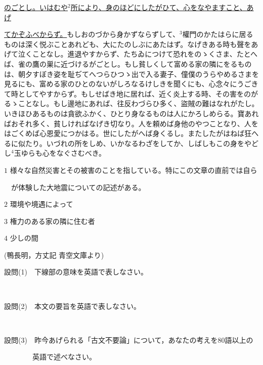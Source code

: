 \documentclass[12pt,a4paper,dvipdfmx]{jarticle}
\begin{document}
\begin{spacing}{1.5}
\hspace{-4mm}
\underline{のごとし。いはむや$^{2}$所により、身のほどにしたがひて、心をなやますこと、あげ}

\hspace{-4mm}
\underline{てかぞふべからず。}もしおのづから身かずならずして、$^{3}$權門のかたはらに居るものは深く悦ぶことあれども、大にたのしぶにあたはず。なげきある時も聲をあげて泣くことなし。進退やすからず、たちゐにつけて恐れをのゝくさま、たとへば、雀の鷹の巣に近づけるがごとし。もし貧しくして富める家の隣にをるものは、朝夕すぼき姿を耻ぢてへつらひつゝ出で入る妻子、僮僕のうらやめるさまを見るにも、富める家のひとのないがしろなるけしきを聞くにも、心念々にうごきて時としてやすからず。もしせばき地に居れば、近く炎上する時、その害をのがるゝことなし。もし邊地にあれば、往反わづらひ多く、盜賊の難はなれがたし。いきほひあるものは貪欲ふかく、ひとり身なるものは人にかろしめらる。寶あればおそれ多く、貧しければなげき切なり。人を頼めば身他のやつことなり、人をはごくめば心恩愛につかはる。世にしたがへば身くるし。またしたがはねば狂へるに似たり。いづれの所をしめ、いかなるわざをしてか、しばしもこの身をやどし$^{4}$玉ゆらも心をなぐさむべき。

\vspace{7mm}

$1$ 様々な自然災害とその被害のことを指している。特にこの文章の直前では自ら

　が体験した大地震についての記述がある。

$2$ 環境や境遇によって

$3$ 権力のある家の隣に住む者

$4$ 少しの間

\vspace{-5mm}\begin{center}
(鴨長明，方丈記 青空文庫より)
\end{center}\vspace{-5mm}

\newpage

設問(1)　下線部の意味を英語で表しなさい。

\

設問(2)　本文の要旨を英語で表しなさい。

\

設問(3)　昨今あげられる「古文不要論」について，あなたの考えを80語以上の

　　　　英語で述べなさい。

\end{spacing}
\end{document}
